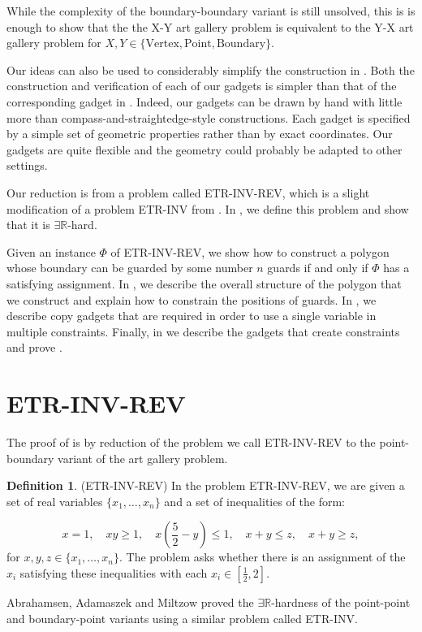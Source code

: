\documentclass[11pt]{article}
\newcommand{\rr}{\mathbb R}
\theoremstyle{plain}
\theoremstyle{definition}
\newtheorem{definition}[theorem]{Definition}
\numberwithin{theorem}{section}
\begin{document}
While the complexity of the boundary-boundary variant is still unsolved, this is is enough to show that the the X-Y art gallery problem is equivalent to the Y-X art gallery problem for $X, Y\in \{\text{Vertex}, \text{Point}, \text{Boundary}\}$. 

Our ideas can also be used to considerably simplify the construction in \cite{ExistsRHardness}. Both the construction and verification of each of our gadgets is simpler than that of the corresponding gadget in \cite{ExistsRHardness}. Indeed, our gadgets can be drawn by hand with little more than compass-and-straightedge-style constructions. Each gadget is specified by a simple set of geometric properties rather than by exact coordinates. Our gadgets are quite flexible and the geometry could probably be adapted to other settings.

Our reduction is from a problem called ETR-INV-REV, which is a slight modification of a problem ETR-INV from \cite{ExistsRHardness}. In , we define this problem and show that it is $\exists\rr$-hard. 

Given an instance $\Phi$ of ETR-INV-REV, we show how to construct a polygon whose boundary can be guarded by some number $n$ guards if and only if $\Phi$ has a satisfying assignment. In , we describe the overall structure of the polygon that we construct and explain how to constrain the positions of guards. In , we describe copy gadgets that are required in order to use a single variable in multiple constraints. Finally, in  we describe the gadgets that create constraints and prove .

\section{ETR-INV-REV}\label{sec:ETR_INV_REV}

The proof of  is by reduction of the problem we call ETR-INV-REV to the point-boundary variant of the art gallery problem.

\begin{definition}
(ETR-INV-REV) In the problem ETR-INV-REV, we are given a set of real variables $\{x_1, \dots, x_n\}$ and a set of inequalities of the form:

\[x=1,\quad xy\ge 1,\quad x\left(\frac52-y\right)\le 1,\quad x+y\le z,\quad x+y\ge z,\]
for $x, y, z\in \{x_1,\dots, x_n\}$. The problem asks whether there is an assignment of the $x_i$ satisfying these inequalities with each $x_i\in[\frac12, 2]$.
\end{definition}
Abrahamsen, Adamaszek and Miltzow \cite{ExistsRHardness} proved the $\exists\rr$-hardness of the point-point and boundary-point variants using a similar problem called ETR-INV.
\end{document}
